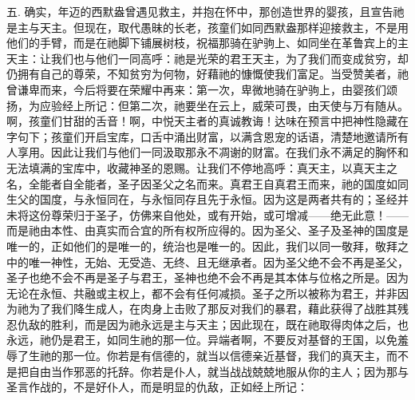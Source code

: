 五. 确实，年迈的西默盎曾遇见救主，并抱在怀中，那创造世界的婴孩，且宣告祂是主与天主。但现在，取代愚昧的长老，孩童们如同西默盎那样迎接救主，不是用他们的手臂，而是在祂脚下铺展树枝，祝福那骑在驴驹上、如同坐在革鲁宾上的主天主：让我们也与他们一同高呼：祂是光荣的君王天主，为了我们而变成贫穷，却仍拥有自己的尊荣，不知贫穷为何物，好藉祂的慷慨使我们富足。当受赞美者，祂曾谦卑而来，今后将要在荣耀中再来：第一次，卑微地骑在驴驹上，由婴孩们颂扬，为应验经上所记：但第二次，祂要坐在云上，威荣可畏，由天使与万有随从。啊，孩童们甘甜的舌音！啊，中悦天主者的真诚教诲！达味在预言中把神性隐藏在字句下；孩童们开启宝库，口舌中涌出财富，以满含恩宠的话语，清楚地邀请所有人享用。因此让我们与他们一同汲取那永不凋谢的财富。在我们永不满足的胸怀和无法填满的宝库中，收藏神圣的恩赐。让我们不停地高呼：真天主，以真天主之名，全能者自全能者，圣子因圣父之名而来。真君王自真君王而来，祂的国度如同生父的国度，与永恒同在，与永恒同存且先于永恒。因为这是两者共有的；圣经并未将这份尊荣归于圣子，仿佛来自他处，或有开始，或可增减——绝无此意！——而是祂由本性、由真实而合宜的所有权所应得的。因为圣父、圣子及圣神的国度是唯一的，正如他们的是唯一的，统治也是唯一的。因此，我们以同一敬拜，敬拜之中的唯一神性，无始、无受造、无终、且无继承者。因为圣父绝不会不再是圣父，圣子也绝不会不再是圣子与君王，圣神也绝不会不再是其本体与位格之所是。因为无论在永恒、共融或主权上，都不会有任何减损。圣子之所以被称为君王，并非因为祂为了我们降生成人，在肉身上击败了那反对我们的暴君，藉此获得了战胜其残忍仇敌的胜利，而是因为祂永远是主与天主；因此现在，既在祂取得肉体之后，也永远，祂仍是君王，如同生祂的那一位。异端者啊，不要反对基督的王国，以免羞辱了生祂的那一位。你若是有信德的，就当以信德亲近基督，我们的真天主，而不是把自由当作邪恶的托辞。你若是仆人，就当战战兢兢地服从你的主人；因为那与圣言作战的，不是好仆人，而是明显的仇敌，正如经上所记：\par

